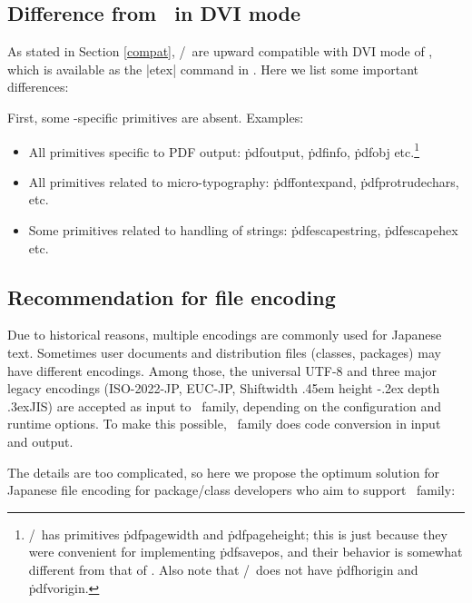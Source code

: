 \documentclass[a4paper,11pt,dvipdfmx]{article}
\let\emph=\origemph
\def\_{\leavevmode\vrule width .45em height -.2ex depth .3ex\relax}
\begin{document}
\subsection{Difference from \pdfTeX\ in DVI mode}\label{dvi-pdftex}

As stated in Section \ref{compat}, \epTeX/\eupTeX\ are
\emph{not} upward compatible with DVI mode of \pdfTeX,
which is available as the |etex| command in \TL.
Here we list some important differences:

First, some \pdfTeX-specific primitives are absent. Examples:
\begin{itemize}
 \item All primitives specific to PDF output:
   \.{pdfoutput}, \.{pdfinfo}, \.{pdfobj} etc.\footnote{%
    \epTeX/\eupTeX\ has primitives \.{pdfpagewidth} and \.{pdfpageheight};
    this is just because they were convenient for implementing \.{pdfsavepos},
    and their behavior is somewhat different from that of \pdfTeX.
    Also note that \epTeX/\eupTeX\ does not have \.{pdfhorigin}
    and \.{pdfvorigin}.}
 \item All primitives related to micro-typography:
   \.{pdffontexpand}, \.{pdfprotrudechars}, etc.
 \item Some primitives related to handling of strings:
   \.{pdfescapestring}, \.{pdfescapehex} etc.
\end{itemize}



\subsection{Recommendation for file encoding}\label{file-enc}

Due to historical reasons,
multiple encodings are commonly used for Japanese text.
Sometimes user documents and distribution files (classes, packages)
may have different encodings.
Among those, the universal UTF-8 and
three major legacy encodings (ISO-2022-JP, EUC-JP, Shift\_JIS)
are accepted as input to \pTeX\ family,
depending on the configuration and runtime options.
To make this possible,
\pTeX\ family does code conversion in input and output.

The details are too complicated, so here we propose
the optimum solution for Japanese file encoding
for package/class developers who aim to support \pTeX\ family:
\end{document}

